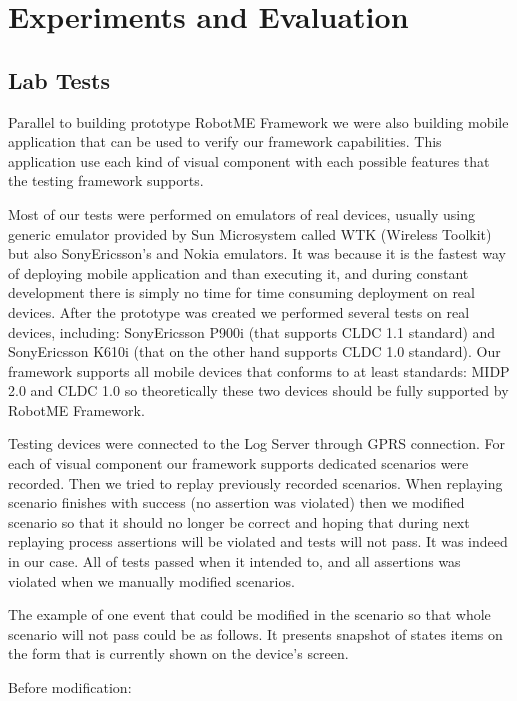 
\chapter{Experiments and Evaluation}

\section{Lab Tests}

Parallel to building prototype RobotME Framework we were also building mobile application
that can be used to verify our framework capabilities. This application use each
kind of visual component with each possible features that the testing framework
supports.

Most of our tests were performed on emulators of real devices, usually using
generic emulator provided by Sun Microsystem called WTK (Wireless Toolkit) but also
SonyEricsson's and Nokia emulators. It was
because it is the fastest way of deploying mobile application and than executing it,
and during constant development there is simply no time for time consuming
deployment on real devices. After the prototype was created we performed several tests on 
real devices, including: SonyEricsson P900i (that supports CLDC 1.1 standard) and
SonyEricsson K610i (that on the other hand supports CLDC 1.0 standard). Our framework
supports all mobile devices that conforms to at least standards: MIDP 2.0 and
CLDC 1.0 so theoretically these two devices should be fully supported by RobotME
Framework.

Testing devices were connected to the Log Server through GPRS connection. For each of
visual component our framework supports dedicated scenarios were recorded. Then
we tried to replay previously recorded scenarios. When replaying scenario finishes
with success (no assertion was violated) then we modified scenario so that it should no longer
be correct and hoping that during next replaying process assertions will be violated
and tests will not pass. It was indeed in our case. All of tests passed when it
intended to, and all assertions was violated when we manually modified scenarios.

The example of one event that could be modified in the scenario so that whole scenario
will not pass could be as follows. It presents snapshot of states items on the form
that is currently shown on the device's screen.

Before modification:

